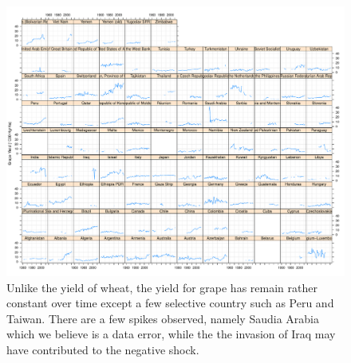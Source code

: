 \documentclass[nojss]{jss}\usepackage[]{graphicx}\usepackage[]{color}
\makeatletter
\def\maxwidth{ %
  \ifdim\Gin@nat@width>\linewidth
    \linewidth
  \else
    \Gin@nat@width
  \fi
}
\newenvironment{knitrout}{}{} %
\makeatother
\begin{document}
\begin{knitrout}
\color{fgcolor}\begin{figure}[!ht]


{\centering \includegraphics[width=\maxwidth]{figure/grape-yield-explore} 

}

\caption[Unlike the yield of wheat, the yield for grape has remain rather constant over time except a few selective country such as Peru and Taiwan]{Unlike the yield of wheat, the yield for grape has remain rather constant over time except a few selective country such as Peru and Taiwan. There are a few spikes observed, namely Saudia Arabia which we believe is a data error, while the the invasion of Iraq may have contributed to the negative shock.\label{fig:grape-yield-explore}}
\end{figure}


\end{knitrout}
\end{document}
